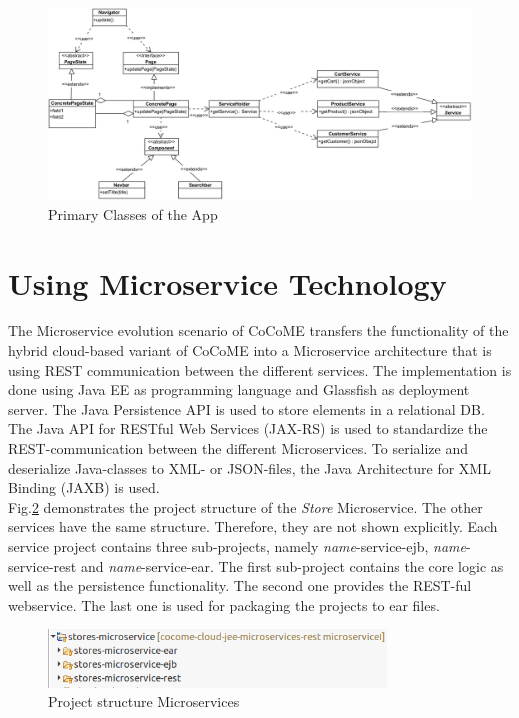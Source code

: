   
   \begin{figure}
  	\includegraphics[width=\textwidth]{img/appBasicClass.png}
  	\caption{Primary Classes of the App}
  	\label{App_ClassDiagram}
  \end{figure}

\FloatBarrier
 
 
 \section{Using Microservice Technology} \label{MicroserviceImplementation}
 The Microservice evolution scenario of CoCoME transfers the functionality of the hybrid cloud-based variant of CoCoME into a Microservice architecture that is using REST communication between the different services. The implementation is done using Java EE as programming language and Glassfish as deployment server. The Java Persistence API is used to store elements in a relational DB. The Java API for RESTful Web Services (JAX-RS)  is used to standardize the REST-communication between the different Microservices. To serialize and deserialize Java-classes to XML- or JSON-files, the Java Architecture for XML Binding (JAXB) is used. 
 \\
 Fig.\ref{projectStructure} demonstrates the project structure of the \textit{Store} Microservice. The other services have the same structure. Therefore, they are not shown explicitly.  Each service project contains three sub-projects, namely \textit{name}-service-ejb, \textit{name}-service-rest and \textit{name}-service-ear. The first sub-project contains the core logic as well as the persistence functionality. The second one provides the REST-ful webservice. The last one is used for packaging the projects to ear files. 
 
 
 

 
	\begin{figure}[h]
		\centering
		\includegraphics[width = 0.8\textwidth] {img/projectStructure_Micro.png}
	 	\caption{Project structure Microservices}
	 	\label{projectStructure}
	 	
 	\end{figure}
 	
